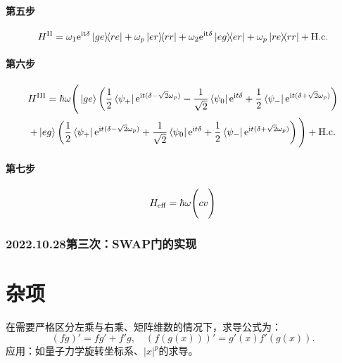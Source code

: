 \documentclass[
fontsetup = font-setup-open.tex,
titlesetup = titles-setup.tex
]{AJbook}
\numberwithin{equation}{section}
\begin{document}
\subsection{第五步}
\begin{equation}\label{key}
H^{\mathrm{II}}=\omega_1\mathrm{e}^{\mathrm{it\delta}}\ketbra{ge}{re}
+\omega_p\ketbra{er}{rr}
+\omega_2\mathrm{e}^{\mathrm{it\delta}}\ketbra{eg}{er}
+\omega_p\ketbra{re}{rr}+\mathrm{H.c.}
\end{equation}
\subsection{第六步}
\begin{multline}
H^{\mathrm{III}}=\hbar\omega\Bigg(\ket{ge}\left(\frac{1}{2}\bra{\psi_+}\mathrm{e}^{\mathrm{i}t(\delta-\sqrt{2}\omega_p)}-\frac{1}{\sqrt{2}}\bra{\psi_0}\mathrm{e}^{\mathrm{i}t \delta}+\frac{1}{2}\bra{\psi_-}\mathrm{e}^{\mathrm{i}t (\delta+\sqrt{2}\omega_p)}\right)\\
+\ket{eg}\left(\frac{1}{2}\bra{\psi_+}\mathrm{e}^{\mathrm{i}t(\delta-\sqrt{2}\omega_p)}+\frac{1}{\sqrt{2}}\bra{\psi_0}\mathrm{e}^{\mathrm{i}t \delta}+\frac{1}{2}\bra{\psi_-}\mathrm{e}^{\mathrm{i}t (\delta+\sqrt{2}\omega_p)}\right)\Bigg)+\mathrm{H.c.}
\end{multline}
\subsection{第七步}
\begin{equation}\label{key}
H_{\mathrm{eff}}=\hbar\omega\Bigg(	cv\Bigg)
\end{equation}
\section[2022.10.28第三次]{2022.10.28第三次：SWAP门的实现}
\part{杂项}
在需要严格区分左乘与右乘、矩阵维数的情况下，求导公式为：
\begin{equation}\label{key}
(fg)'=fg'+f'g,\quad (f(g(x)))'=g'(x)f'(g(x)).
\end{equation}
应用：如量子力学旋转坐标系、$ |x|^p $的求导。
\appendix

\backmatter
\printbibliography[heading=bibintoc]

\listoffigures
\listoftables

{\footnotesize
{}
\printindex}
\end{document}
